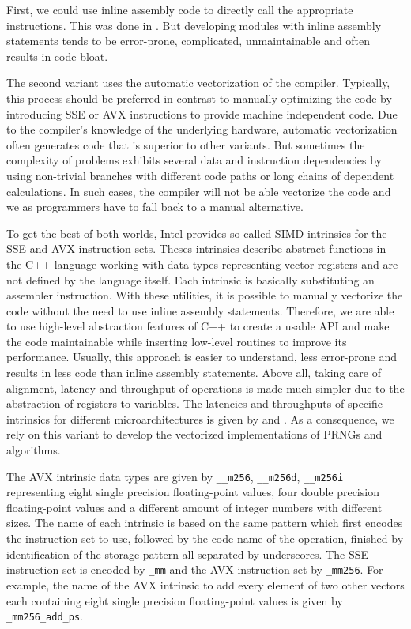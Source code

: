 \documentclass{stdlocal}
\begin{document}
    First, we could use inline assembly code to directly call the appropriate instructions.
    This was done in \textcite{guskova2016,barash2017}.
    But developing modules with inline assembly statements tends to be error-prone, complicated, unmaintainable and often results in code bloat.

    The second variant uses the automatic vectorization of the compiler.
    Typically, this process should be preferred in contrast to manually optimizing the code by introducing SSE or AVX instructions to provide machine independent code.
    Due to the compiler's knowledge of the underlying hardware, automatic vectorization often generates code that is superior to other variants.
    But sometimes the complexity of problems exhibits several data and instruction dependencies by using non-trivial branches with different code paths or long chains of dependent calculations.
    In such cases, the compiler will not be able vectorize the code and we as programmers have to fall back to a manual alternative.

    To get the best of both worlds, Intel provides so-called SIMD intrinsics for the SSE and AVX instruction sets.
    Theses intrinsics describe abstract functions in the C++ language working with data types representing vector registers and are not defined by the language itself.
    Each intrinsic is basically substituting an assembler instruction.
    With these utilities, it is possible to manually vectorize the code without the need to use inline assembly statements.
    Therefore, we are able to use high-level abstraction features of C++ to create a usable API and make the code maintainable while inserting low-level routines to improve its performance.
    Usually, this approach is easier to understand, less error-prone and results in less code than inline assembly statements.
    Above all, taking care of alignment, latency and throughput of operations is made much simpler due to the abstraction of registers to variables.
    The latencies and throughputs of specific intrinsics for different microarchitectures is given by \textcite{intel-intrinsics-guide} and \textcite{fog2019d}.
    As a consequence, we rely on this variant to develop the vectorized implementations of PRNGs and algorithms.

    The AVX intrinsic data types are given by \texttt{\_\_m256}, \texttt{\_\_m256d}, \texttt{\_\_m256i} representing eight single precision floating-point values, four double precision floating-point values and a different amount of integer numbers with different sizes.
    The name of each intrinsic is based on the same pattern which first encodes the instruction set to use, followed by the code name of the operation, finished by identification of the storage pattern all separated by underscores.
    The SSE instruction set is encoded by \texttt{\_mm} and the AVX instruction set by \texttt{\_mm256}.
    For example, the name of the AVX intrinsic to add every element of two other vectors each containing eight single precision floating-point values is given by \texttt{\_mm256\_add\_ps}.
\end{document}
